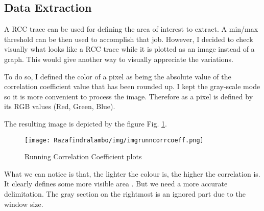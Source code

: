 


\subsection{Data Extraction}
A RCC trace can be used for defining the area of interest to extract. A min/max threshold can be
then used to accomplish that job.
However, I decided to check visually what looks like a RCC trace while it is plotted as an image instead of
a graph. This would give another way to visually appreciate the variations.

To do so, I defined the color of a pixel as being the absolute value of the correlation coefficient
value that has been rounded up. I kept the gray-scale mode so it is more convenient to process the
image. Therefore as a pixel is defined by its RGB values (Red, Green, Blue).


The resulting image is depicted by the figure Fig. \ref{fig:imgrunncorrcoeff}.

\begin{figure}[!h]
\begin{center}
    \texttt{[image: Razafindralambo/img/imgrunncorrcoeff.png]}
    \caption{Running Correlation Coefficient plots}
    \label{fig:imgrunncorrcoeff}
\end{center}
\end{figure}

What we can notice is that, the lighter the colour is, the higher the correlation is. It clearly
defines some more visible area . But we need a more accurate delimitation. The gray section on the
rightmost is an ignored part due to the window size.

